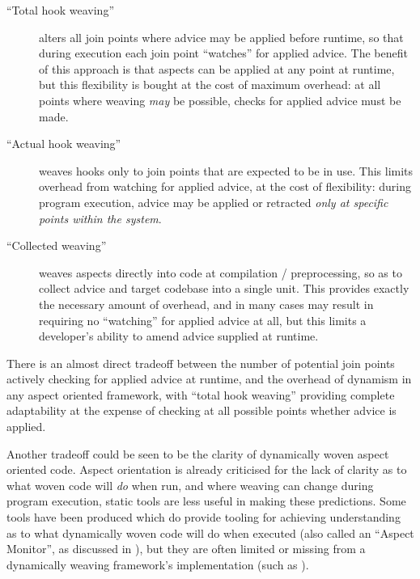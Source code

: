 \begin{description}
    \item[``Total hook weaving''] alters all join points where advice may be
    applied before runtime, so that during execution each join point ``watches''
    for applied advice. The benefit of this approach is that aspects can be
    applied at any point at runtime, but this flexibility is bought at the cost
    of maximum overhead: at all points where weaving \emph{may} be possible,
    checks for applied advice must be made.
    \item[``Actual hook weaving''] weaves hooks only to join points that are
    expected to be in use. This limits overhead from watching for applied
    advice, at the cost of flexibility: during program execution, advice may be
    applied or retracted \emph{only at specific points within the system}.
    \item[``Collected weaving''] weaves aspects directly into code at
    compilation / preprocessing, so as
    to collect advice and target codebase into a single unit. This provides
    exactly the necessary amount of overhead, and in many cases may result in
    requiring no ``watching'' for applied advice at all, but this limits a
    developer's ability to amend advice supplied at runtime.
\end{description}

There is an almost direct tradeoff between the number of potential join points
actively checking for applied advice at runtime, and the overhead of dynamism in
any aspect oriented framework, with ``total hook weaving'' providing complete
adaptability at the expense of checking at all possible points whether advice is
applied.

Another tradeoff could be seen to be the clarity of dynamically woven aspect
oriented code. Aspect orientation is already criticised for the lack of clarity
as to what woven code will \emph{do} when run, and where weaving can change
during program execution, static tools are less useful in making these
predictions. Some tools have been produced which do provide tooling for
achieving understanding as to what dynamically woven code will do when executed
(also called an ``Aspect Monitor'', as discussed in \cite{popovici2002PROSE}),
but they are often limited or missing from a dynamically weaving framework's
implementation (such as \cite{Baker_2002}). 


